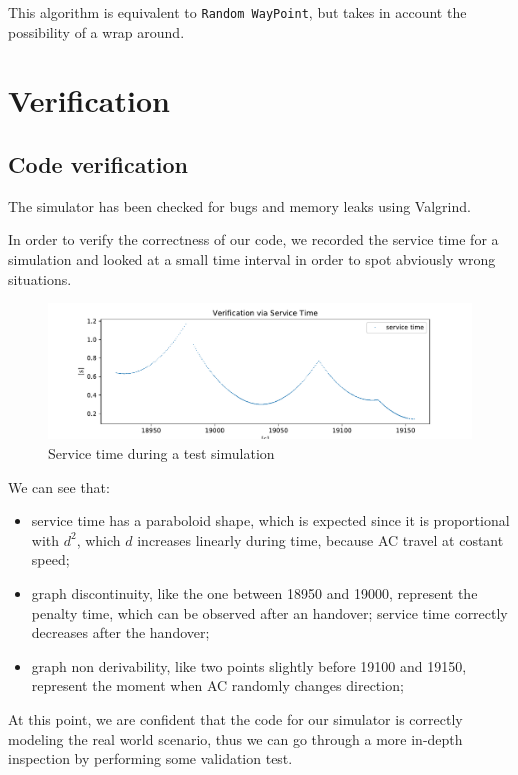 \documentclass[a4paper,12pt]{article}
\begin{document}
This algorithm is equivalent to \texttt{Random WayPoint}, but takes in account the possibility of a wrap around.

\section{Verification}
\subsection{Code verification}
The simulator has been checked for bugs and memory leaks using Valgrind.

In order to verify the correctness of our code, we recorded the service time for a simulation and looked at a small time interval in order to spot abviously wrong situations.

\begin{figure}[H]
  \centering
  \includegraphics[scale=0.6]{img/verification-via-service-time.pdf}
  \caption{Service time during a test simulation}
  \label{fig:verification-via-service-time}
\end{figure}

We can see that:
\begin{itemize}
  \item service time has a paraboloid shape, which is expected since it is proportional with $d^2$, which $d$ increases linearly during time, because AC travel at costant speed;
  \item graph discontinuity, like the one between 18950 and 19000, represent the penalty time, which can be observed after an handover; service time correctly decreases after the handover;
  \item graph non derivability, like two points slightly before 19100 and 19150, represent the moment when AC randomly changes direction;
\end{itemize}

At this point, we are confident that the code for our simulator is correctly modeling the real world scenario, thus we can go through a more in-depth inspection by performing some validation test.
\end{document}
